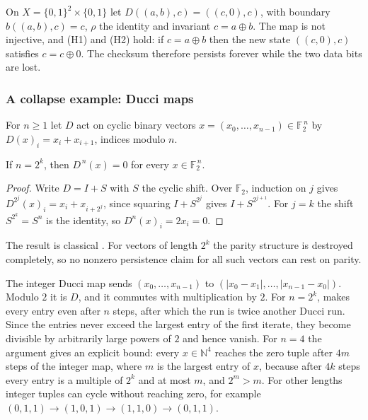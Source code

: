 \begin{example}\label{ex:G10-checksum}
On $X = \{0,1\}^2 \times \{0,1\}$ let $D((a, b), c) = ((c, 0), c)$, with boundary $b((a,b),c) = c$,
$\rho$ the identity and invariant $c = a \oplus b$. The map is not injective, and (H1) and (H2)
hold: if $c = a \oplus b$ then the new state $((c, 0), c)$ satisfies $c = c \oplus 0$. The checksum
therefore persists forever while the two data bits are lost.
\end{example}

\subsubsection*{A collapse example: Ducci maps}\label{sec:ducci}

For $n \ge 1$ let $D$ act on cyclic binary vectors $x = (x_0, \ldots, x_{n-1}) \in
\mathbb{F}_2^{\,n}$ by $D(x)_i = x_i + x_{i+1}$, indices modulo $n$.

\begin{theorem}\label{thm:ducci}
If $n = 2^k$, then $D^{\,n}(x) = 0$ for every $x \in \mathbb{F}_2^{\,n}$.
\end{theorem}

\begin{proof}
Write $D = I + S$ with $S$ the cyclic shift. Over $\mathbb{F}_2$, induction on $j$ gives
$D^{2^j}(x)_i = x_i + x_{i+2^j}$, since squaring $I + S^{2^j}$ gives $I + S^{2^{j+1}}$. For $j = k$
the shift $S^{2^k} = S^n$ is the identity, so $D^n(x)_i = 2x_i = 0$.
\end{proof}

The result is classical \citep{ChamberlandThomas2004,Breuer2007b}. For vectors of length $2^k$ the
parity structure is destroyed completely, so no nonzero persistence claim for all such vectors can
rest on parity.

\begin{remark}\label{rem:ducci-integer}
The integer Ducci map sends $(x_0, \ldots, x_{n-1})$ to $(|x_0 - x_1|, \ldots, |x_{n-1} - x_0|)$.
Modulo $2$ it is $D$, and it commutes with multiplication by $2$. For $n = 2^k$, 
makes every entry even after $n$ steps, after which the run is twice another Ducci run. Since the
entries never exceed the largest entry of the first iterate, they become divisible by arbitrarily
large powers of $2$ and hence vanish. For $n = 4$ the argument gives an explicit bound: every
$x \in \mathbb{N}^4$ reaches the zero tuple after $4m$ steps of the integer map, where $m$ is the
largest entry of $x$, because after
$4k$ steps every entry is a multiple of $2^k$ and at most $m$, and $2^m > m$. For other lengths
integer tuples can cycle without reaching zero, for example $(0,1,1) \to (1,0,1) \to (1,1,0) \to
(0,1,1)$.
\end{remark}

